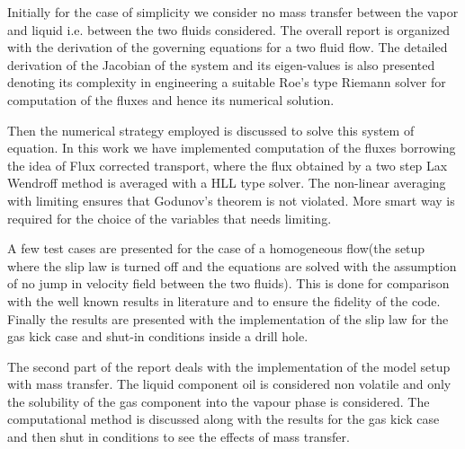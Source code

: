 \documentclass[a4paper,16pt]{article}
\begin{document}
Initially for the case of simplicity we consider no mass transfer between the vapor and liquid i.e. between the two fluids considered. The overall report is organized with the derivation of the governing equations for a two fluid flow.  The detailed derivation of the Jacobian of the system and its eigen-values is also presented denoting its complexity in engineering a suitable Roe's type Riemann solver for computation of the fluxes and hence its numerical solution.

Then the numerical strategy employed is discussed to solve this system of equation. In this work we have implemented computation of the fluxes borrowing the idea of Flux corrected transport,  where the flux obtained by a two step Lax Wendroff method is averaged with a HLL type solver. The non-linear averaging with limiting ensures that Godunov's theorem is not violated. More smart way is required for the choice of the variables that needs limiting.

A few test cases are presented for the case of a homogeneous flow(the setup where the slip law is turned off and the equations are solved with the assumption of no jump in velocity field between the two fluids). This is done for comparison with the well known results in literature and to ensure the fidelity of the code. Finally the results are presented with the implementation of the slip law for the gas kick case and shut-in conditions inside a drill hole.

The second part of the report deals with the implementation of the model setup with mass transfer. The liquid component oil is considered non volatile and only the solubility of the gas component into the vapour phase is considered. The computational method is discussed along with the results for the gas kick case and then shut in conditions to see the effects of mass transfer.
\end{document}
